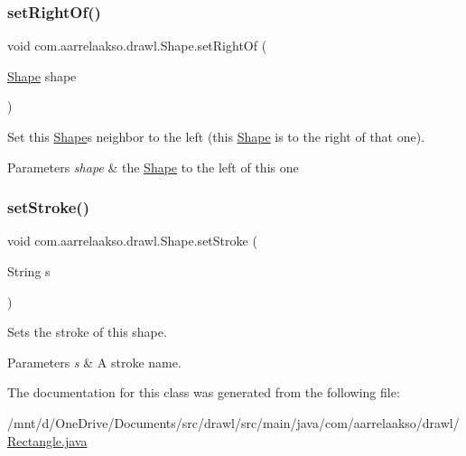\subsubsection{\texorpdfstring{set\+Right\+Of()}{setRightOf()}}
{\footnotesize\ttfamily void com.\+aarrelaakso.\+drawl.\+Shape.\+set\+Right\+Of (\begin{DoxyParamCaption}\item[{\hyperlink{classcom_1_1aarrelaakso_1_1drawl_1_1_shape}{Shape}}]{shape }\end{DoxyParamCaption})\hspace{0.3cm}{\ttfamily [inherited]}}



Set this \hyperlink{classcom_1_1aarrelaakso_1_1drawl_1_1_shape}{Shape}\textquotesingle{}s neighbor to the left (this \hyperlink{classcom_1_1aarrelaakso_1_1drawl_1_1_shape}{Shape} is to the right of that one). 


\begin{DoxyParams}{Parameters}
{\em shape} & the \hyperlink{classcom_1_1aarrelaakso_1_1drawl_1_1_shape}{Shape} to the left of this one \\
\hline
\end{DoxyParams}
\mbox{\label{classcom_1_1aarrelaakso_1_1drawl_1_1_shape_a3930f6fe72f6c5e0c0aa4c25ffbf18ff}} 
\subsubsection{\texorpdfstring{set\+Stroke()}{setStroke()}}
{\footnotesize\ttfamily void com.\+aarrelaakso.\+drawl.\+Shape.\+set\+Stroke (\begin{DoxyParamCaption}\item[{String}]{s }\end{DoxyParamCaption})\hspace{0.3cm}{\ttfamily [inherited]}}



Sets the stroke of this shape. 


\begin{DoxyParams}{Parameters}
{\em s} & A stroke name. \\
\hline
\end{DoxyParams}


The documentation for this class was generated from the following file\+:\begin{DoxyCompactItemize}
\item 
/mnt/d/\+One\+Drive/\+Documents/src/drawl/src/main/java/com/aarrelaakso/drawl/\hyperlink{_rectangle_8java}{Rectangle.\+java}\end{DoxyCompactItemize}
